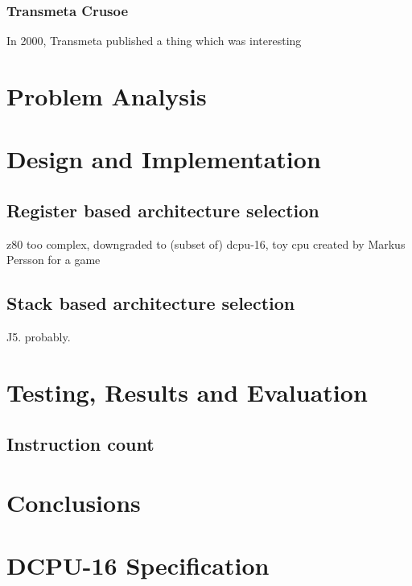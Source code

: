 \documentclass[11pt,a4paper,notitlepage]{report}
\begin{document}
\subsection{Transmeta Crusoe}
In 2000, Transmeta published a thing which was interesting\cite{TransmetaCodeMorph}

\chapter{Problem Analysis}

\chapter{Design and Implementation}
\section{Register based architecture selection}
z80 too complex, downgraded to (subset of) dcpu-16, toy cpu created by Markus
Persson for a game
\section{Stack based architecture selection}
J5. probably.

\chapter{Testing, Results and Evaluation}
\section{Instruction count}

\chapter{Conclusions}

\printbibliography%
\clearpage

\appendix
\chapter{DCPU-16 Specification}
\end{document}
